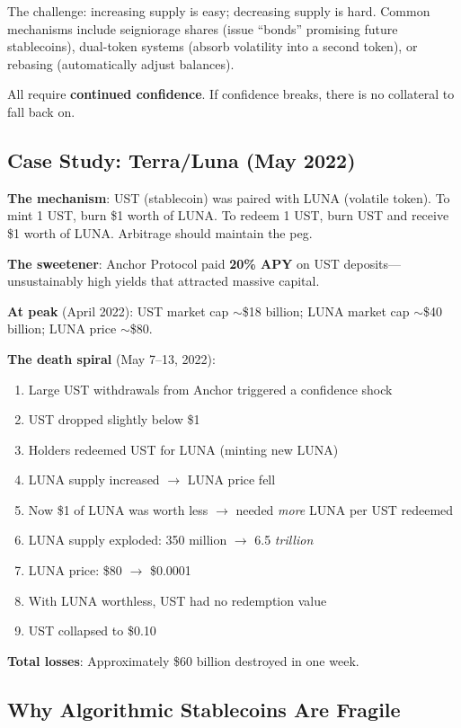 \documentclass[11pt,a4paper]{article}
\newcommand{\keyword}[1]{\textbf{\textcolor{AccentOrange}{#1}}}
\begin{document}
The challenge: increasing supply is easy; decreasing supply is hard. Common mechanisms include seigniorage shares (issue ``bonds'' promising future stablecoins), dual-token systems (absorb volatility into a second token), or rebasing (automatically adjust balances).

All require \keyword{continued confidence}. If confidence breaks, there is no collateral to fall back on.

\subsection{Case Study: Terra/Luna (May 2022)}

\textbf{The mechanism}: UST (stablecoin) was paired with LUNA (volatile token). To mint 1 UST, burn \$1 worth of LUNA. To redeem 1 UST, burn UST and receive \$1 worth of LUNA. Arbitrage should maintain the peg.

\textbf{The sweetener}: Anchor Protocol paid \keyword{20\% APY} on UST deposits---unsustainably high yields that attracted massive capital.

\textbf{At peak} (April 2022): UST market cap $\sim$\$18 billion; LUNA market cap $\sim$\$40 billion; LUNA price $\sim$\$80.

\textbf{The death spiral} (May 7--13, 2022):
\begin{enumerate}
    \item Large UST withdrawals from Anchor triggered a confidence shock
    \item UST dropped slightly below \$1
    \item Holders redeemed UST for LUNA (minting new LUNA)
    \item LUNA supply increased $\rightarrow$ LUNA price fell
    \item Now \$1 of LUNA was worth less $\rightarrow$ needed \textit{more} LUNA per UST redeemed
    \item LUNA supply exploded: 350 million $\rightarrow$ 6.5 \textit{trillion}
    \item LUNA price: \$80 $\rightarrow$ \$0.0001
    \item With LUNA worthless, UST had no redemption value
    \item UST collapsed to \$0.10
\end{enumerate}

\textbf{Total losses}: Approximately \$60 billion destroyed in one week.

\subsection{Why Algorithmic Stablecoins Are Fragile}
\end{document}
